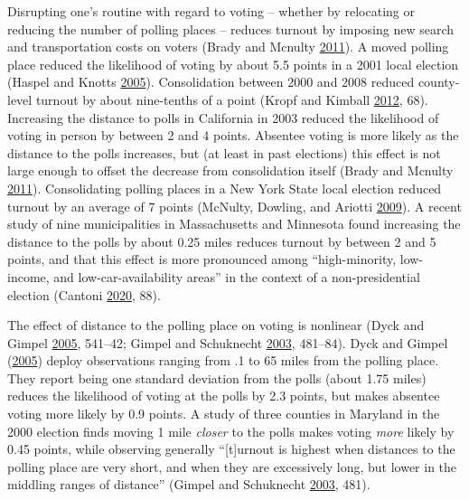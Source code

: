 \documentclass[
  12pt,
]{article}
\begin{document}
Disrupting one's routine with regard to voting -- whether by relocating or reducing the number of polling places -- reduces turnout by imposing new search and transportation costs on voters (Brady and Mcnulty \protect\hyperlink{ref-Brady2011}{2011}). A moved polling place reduced the likelihood of voting by about 5.5 points in a 2001 local election (Haspel and Knotts \protect\hyperlink{ref-Haspel2005}{2005}). Consolidation between 2000 and 2008 reduced county-level turnout by about nine-tenths of a point (Kropf and Kimball \protect\hyperlink{ref-Kropf2012}{2012}, 68). Increasing the distance to polls in California in 2003 reduced the likelihood of voting in person by between 2 and 4 points. Absentee voting is more likely as the distance to the polls increases, but (at least in past elections) this effect is not large enough to offset the decrease from consolidation itself (Brady and Mcnulty \protect\hyperlink{ref-Brady2011}{2011}). Consolidating polling places in a New York State local election reduced turnout by an average of 7 points (McNulty, Dowling, and Ariotti \protect\hyperlink{ref-McNulty2009}{2009}). A recent study of nine municipalities in Massachusetts and Minnesota found increasing the distance to the polls by about 0.25 miles reduces turnout by between 2 and 5 points, and that this effect is more pronounced among ``high-minority, low-income, and low-car-availability areas'' in the context of a non-presidential election (Cantoni \protect\hyperlink{ref-Cantoni2020}{2020}, 88).

The effect of distance to the polling place on voting is nonlinear (Dyck and Gimpel \protect\hyperlink{ref-Dyck2005}{2005}, 541--42; Gimpel and Schuknecht \protect\hyperlink{ref-Gimpel2003}{2003}, 481--84). Dyck and Gimpel (\protect\hyperlink{ref-Dyck2005}{2005}) deploy observations ranging from .1 to 65 miles from the polling place. They report being one standard deviation from the polls (about 1.75 miles) reduces the likelihood of voting at the polls by 2.3 points, but makes absentee voting more likely by 0.9 points. A study of three counties in Maryland in the 2000 election finds moving 1 mile \emph{closer} to the polls makes voting \emph{more} likely by 0.45 points, while observing generally ``{[}t{]}urnout is highest when distances to the polling place are very short, and when they are excessively long, but lower in the middling ranges of distance'' (Gimpel and Schuknecht \protect\hyperlink{ref-Gimpel2003}{2003}, 481).
\end{document}
